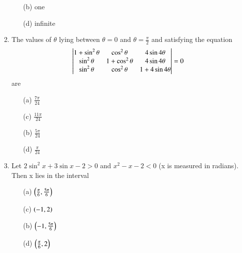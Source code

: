 \documentclass[journal,12pt,twocolumn,article]{IEEEtran}
\theoremstyle{remark}
\begin{document}
\begin{enumerate}
\begin{multicols}{2}
\begin{enumerate}
\columnbreak
\item[(b)] one
\item[(d)] infinite
\end{enumerate}
\end{multicols}
\item The values of $\theta$ lying between $\theta = 0$ and $\theta = \frac{\pi}{2}$ and satisfying the equation
\[\begin{vmatrix}
$$1+\sin^2\theta$$ & $$\cos^2\theta$$ & $$4\sin4\theta$$\\
$$\sin^2\theta$$ & $$1+\cos^2\theta$$ & $$4\sin4\theta$$\\
$$\sin^2\theta$$ & $$\cos^2\theta$$ & $$1+4\sin4\theta$$
\end{vmatrix} = 0\] are
\hfill{}
\begin{multicols}{2}
\begin{enumerate}
\item[(a)] $\frac{7\pi}{24}$
\item[(c)] $\frac{11\pi}{24}$
\columnbreak
\item[(b)] $\frac{5\pi}{24}$
\item[(d)] $\frac{\pi}{24}$
\end{enumerate}
\end{multicols}
\item Let $2\sin^2x+3\sin x-2>0$ and $x^2-x-2<0$ (x is measured in radians). Then x lies in the interval
\hfill{}
\begin{multicols}{2}
\begin{enumerate}
\item[(a)] $\left(\frac{\pi}{6},\frac{5\pi}{6}\right)$
\item[(c)] $\left(-1,2\right)$
\columnbreak
\item[(b)] $\left(-1,\frac{5\pi}{6}\right)$
\item[(d)] $\left(\frac{\pi}{6},2\right)$
\end{enumerate}
\end{multicols}
\end{enumerate}
\end{document}
